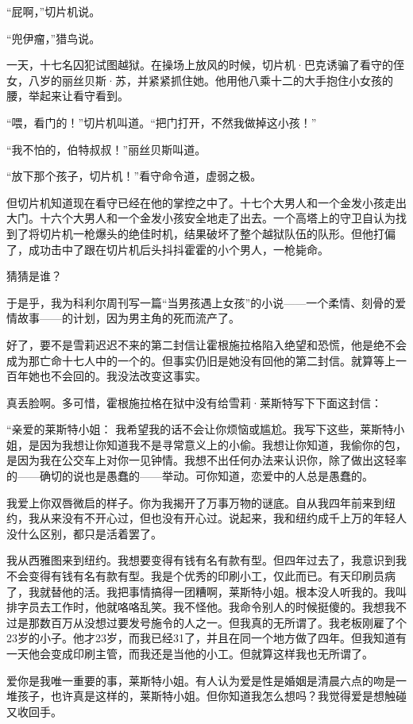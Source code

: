 “屁啊，”切片机说。

“兜伊瘤，”猎鸟说。

一天，十七名囚犯试图越狱。在操场上放风的时候，切片机·巴克诱骗了看守的侄女，八岁的丽丝贝斯·苏，并紧紧抓住她。他用他八乘十二的大手抱住小女孩的腰，举起来让看守看到。

“喂，看门的！”切片机叫道。“把门打开，不然我做掉这小孩！”

“我不怕的，伯特叔叔！”丽丝贝斯叫道。

“放下那个孩子，切片机！”看守命令道，虚弱之极。

但切片机知道现在看守已经在他的掌控之中了。十七个大男人和一个金发小孩走出大门。十六个大男人和一个金发小孩安全地走了出去。一个高塔上的守卫自认为找到了将切片机一枪爆头的绝佳时机，结果破坏了整个越狱队伍的队形。但他打偏了，成功击中了跟在切片机后头抖抖霍霍的小个男人，一枪毙命。

猜猜是谁？

于是乎，我为科利尔周刊写一篇“当男孩遇上女孩”的小说——一个柔情、刻骨的爱情故事——的计划，因为男主角的死而流产了。

好了，要不是雪莉迟迟不来的第二封信让霍根施拉格陷入绝望和恐慌，他是绝不会成为那亡命十七人中的一个的。但事实仍旧是她没有回他的第二封信。就算等上一百年她也不会回的。我没法改变这事实。

真丢脸啊。多可惜，霍根施拉格在狱中没有给雪莉·莱斯特写下下面这封信：

“亲爱的莱斯特小姐：
我希望我的话不会让你烦恼或尴尬。我写下这些，莱斯特小姐，是因为我想让你知道我不是寻常意义上的小偷。我想让你知道，我偷你的包，是因为我在公交车上对你一见钟情。我想不出任何办法来认识你，除了做出这轻率的——确切的说也是愚蠢的——举动。可你知道，恋爱中的人总是愚蠢的。

我爱上你双唇微启的样子。你为我揭开了万事万物的谜底。自从我四年前来到纽约，我从来没有不开心过，但也没有开心过。说起来，我和纽约成千上万的年轻人没什么区别，都只是活着罢了。

我从西雅图来到纽约。我想要变得有钱有名有款有型。但四年过去了，我意识到我不会变得有钱有名有款有型。我是个优秀的印刷小工，仅此而已。有天印刷员病了，我就替他的活。我把事情搞得一团糟啊，莱斯特小姐。根本没人听我的。我叫排字员去工作时，他就咯咯乱笑。我不怪他。我命令别人的时候挺傻的。我想我不过是那数百万从没想过要发号施令的人之一。但我真的无所谓了。我老板刚雇了个23岁的小子。他才23岁，而我已经31了，并且在同一个地方做了四年。但我知道有一天他会变成印刷主管，而我还是当他的小工。但就算这样我也无所谓了。

爱你是我唯一重要的事，莱斯特小姐。有人认为爱是性是婚姻是清晨六点的吻是一堆孩子，也许真是这样的，莱斯特小姐。但你知道我怎么想吗？我觉得爱是想触碰又收回手。

